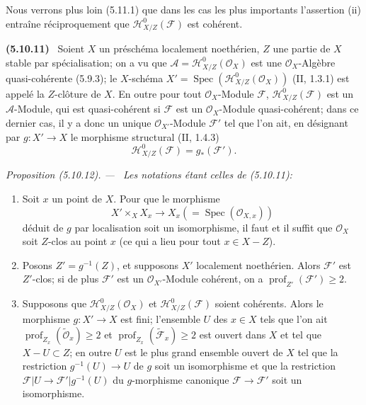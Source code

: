 \documentclass[10pt,oneside]{book}
\newenvironment{env}[1][]{\par\medskip\noindent\textbf{(#1)}\ }{\par}
\newenvironment{proposition}[1][]{%
  \par\medskip\noindent\itshape Proposition (#1). ---\ }{\par}
\begin{document}
Nous verrons plus loin (5.11.1) que dans les cas les plus importants
l'assertion (ii) entraîne réciproquement que
$\mathcal H^0_{X/Z}(\mathcal F)$ est cohérent.

\begin{env}[5.10.11]
\label{IV.2.s5.10.11-fr}
Soient $X$ un préschéma localement noethérien, $Z$ une partie de $X$ stable
par spécialisation; on a vu que
$\mathcal A=\mathcal H^0_{X/Z}(\mathcal O_X)$ est une
$\mathcal O_X$-Algèbre quasi-cohérente (5.9.3); le $X$-schéma
$X'=\operatorname{Spec}(\mathcal H^0_{X/Z}(\mathcal O_X))$ (II, 1.3.1) est
appelé la $Z$-clôture de $X$. En outre pour tout $\mathcal O_X$-Module
$\mathcal F$, $\mathcal H^0_{X/Z}(\mathcal F)$ est un $\mathcal A$-Module,
qui est quasi-cohérent si $\mathcal F$ est un $\mathcal O_X$-Module
quasi-cohérent; dans ce dernier cas, il y a donc un unique
$\mathcal O_{X'}$-Module $\mathcal F'$ tel que l'on ait, en désignant par
$g:X'\to X$ le morphisme structural (II, 1.4.3)
\begin{equation}
\mathcal H^0_{X/Z}(\mathcal F)=g_*(\mathcal F').
\tag{5.10.11.1}\label{IV.2.s5.10.11.1-fr}
\end{equation}
\end{env}

\begin{proposition}[5.10.12]
\label{IV.2.s5.10.12-fr}
Les notations étant celles de (5.10.11):
\begin{enumerate}
\item[(i)] Soit $x$ un point de $X$. Pour que le morphisme
\[
X'\times_X X_x\longrightarrow X_x(=\operatorname{Spec}(\mathcal O_{X,x}))
\]
déduit de $g$ par localisation soit un isomorphisme, il faut et il suffit que
$\mathcal O_X$ soit $Z$-clos au point $x$ (ce qui a lieu pour tout $x\in X-Z$).
\item[(ii)] Posons $Z'=g^{-1}(Z)$, et supposons $X'$ localement noethérien.
Alors $\mathcal F'$ est $Z'$-clos; si de plus $\mathcal F'$ est un
$\mathcal O_{X'}$-Module cohérent, on a
$\operatorname{prof}_{Z'}(\mathcal F')\geq2$.
\item[(iii)] Supposons que $\mathcal H^0_{X/Z}(\mathcal O_X)$ et
$\mathcal H^0_{X/Z}(\mathcal F)$ soient cohérents. Alors le morphisme
$g:X'\to X$ est fini; l'ensemble $U$ des $x\in X$ tels que l'on ait
$\operatorname{prof}_{Z_x}(\widetilde{\mathcal O}_x)\geq2$ et
$\operatorname{prof}_{Z_x}(\widetilde{\mathcal F}_x)\geq2$ est ouvert dans
$X$ et tel que $X-U\subset Z$; en outre $U$ est le plus grand ensemble ouvert
de $X$ tel que la restriction $g^{-1}(U)\to U$ de $g$ soit un isomorphisme et
que la restriction $\mathcal F|U\to\mathcal F'|g^{-1}(U)$ du $g$-morphisme
canonique $\mathcal F\to\mathcal F'$ soit un isomorphisme.
\end{enumerate}
\end{proposition}
\end{document}
